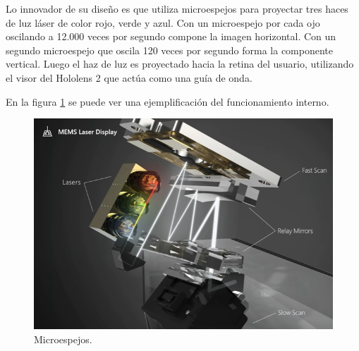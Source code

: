 Lo innovador de su diseño es que utiliza microespejos para proyectar tres haces de luz láser de color rojo, verde y azul. Con un microespejo por cada ojo oscilando a 12.000 veces por segundo compone la imagen horizontal. Con un segundo microespejo que oscila 120 veces por segundo forma la componente vertical. Luego el haz de luz es proyectado hacia la retina del usuario, utilizando el visor del Hololens 2 que actúa como una guía de onda. 

\begin{table}[htpb]
	\centering
	\caption[Hardware Hololens 2]{Especificaciones técnicas Hololens 2}
	\label{tab:holotab}
\end{table}

En la figura \ref{fig:Lasers} se puede ver una ejemplificación del funcionamiento interno.

\begin{figure}[htpb]
	\centering
	\includegraphics[width=\textwidth]{./Figures/Lasers.png}
	\caption{Microespejos\protect\footnotemark.}
	\label{fig:Lasers}
\end{figure}

